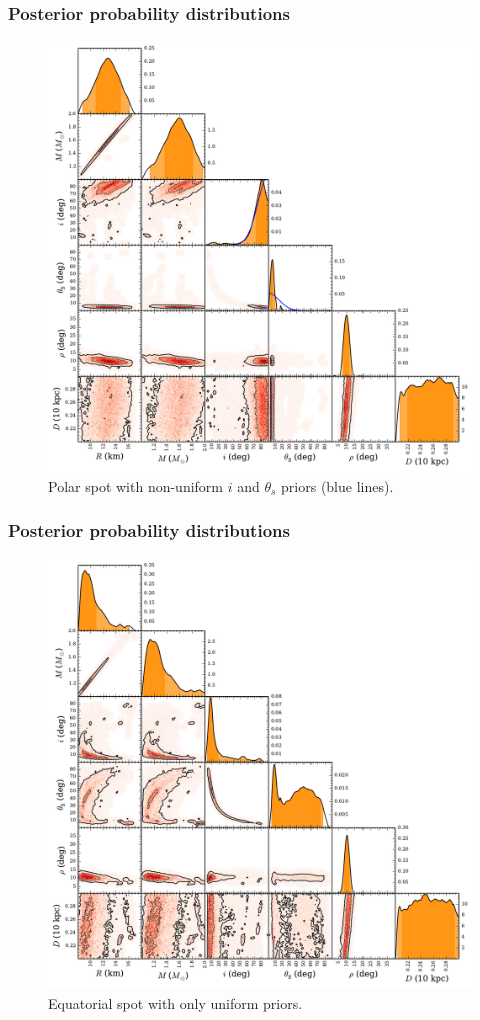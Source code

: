 \documentclass{beamer}
\def\thetas{\theta_{s}}
\begin{document}
\begin{frame}
\frametitle{Posterior probability distributions}

\begin{figure}
\includegraphics[width=0.55\linewidth]{fpolprf.pdf}
\caption{Polar spot with non-uniform $i$ and $\thetas$ priors (blue lines).}
\end{figure}

\end{frame}



\begin{frame}
\frametitle{Posterior probability distributions}

\begin{figure}
\includegraphics[width=0.55\linewidth]{feqf.pdf}
\caption{Equatorial spot with only uniform priors.}
\end{figure}

\end{frame}
\end{document}
